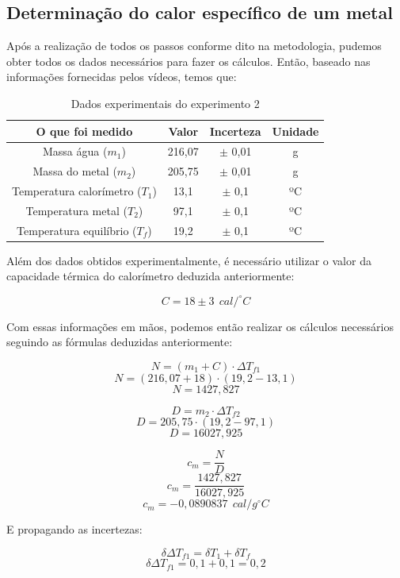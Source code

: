 \subsection{Determinação do calor específico de um metal}

Após a realização de todos os passos conforme dito na metodologia, pudemos obter todos os dados necessários para fazer os cálculos. Então, baseado nas informações fornecidas pelos vídeos, temos que:

\begin{table}[H]
    \centering
    \begin{tabular}{ |c||c||c||c| }
        \hline
        \textbf{O que foi medido} & \textbf{Valor} & \textbf{Incerteza} & \textbf{Unidade}\\
        \hline 
        Massa água ($m_1$) & 216,07 & $\pm$ 0,01 & g \\
        Massa do metal ($m_2$) & 205,75 & $\pm$ 0,01 & g \\
        \hline
        Temperatura calorímetro ($T_1$) & 13,1 & $\pm$ 0,1 & ºC \\
        Temperatura metal ($T_2$) & 97,1 & $\pm$ 0,1 & ºC \\
        Temperatura equilíbrio ($T_f$) & 19,2 & $\pm$ 0,1 & ºC \\
        \hline
        \end{tabular}
    \caption{Dados experimentais do experimento 2} 
\end{table}

Além dos dados obtidos experimentalmente, é necessário utilizar o valor da capacidade térmica do calorímetro deduzida anteriormente:

\[ C = 18 \pm 3 \ \ cal/^\circ C \]

Com essas informações em mãos, podemos então realizar os cálculos necessários seguindo as fórmulas deduzidas anteriormente:

\[ N = (m_1 + C) \cdot \Delta T_{f1} \]
\[ N = (216,07 + 18) \cdot (19,2 - 13,1) \]
\[ N = 1427,827 \]

\[ D = m_2 \cdot \Delta T_{f2} \]
\[ D = 205,75 \cdot (19,2 - 97,1) \]
\[ D = 16027,925 \]

\[ c_m = \frac{N}{D} \]
\[ c_m = \frac{1427,827}{16027,925} \]
\[ c_m = - 0,0890837 \ \ cal/g^\circ C \]

E propagando as incertezas:

\[ \delta \Delta T_{f1} = \delta T_1 + \delta T_f \]
\[ \delta \Delta T_{f1} = 0,1 + 0,1 = 0,2 \]

